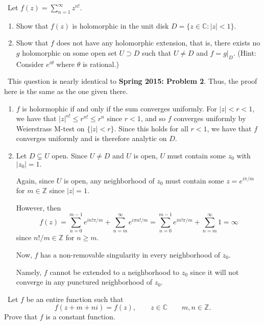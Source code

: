 \documentclass[12pt]{Qual}
\begin{document}
\begin{problem} $\,$
Let $f(z)=\sum_{n=1}^\infty z^{n!}$.
\begin{enumerate}[label=(\alph*)]
    \item Show that $f(z)$ is holomorphic in the unit disk $D=\{z\in\mathbb{C}:|z|<1\}$.
    \item Show that $f$ does not have any holomorphic extension, that is, there exists no $g$ holomorphic on some open set $U\supset D$ such that $U\not=D$ and $f=g|_D$. (Hint: Consider $e^{i\theta}$ where $\theta$ is rational.)
\end{enumerate}
\end{problem}


\begin{solution}$\,$
This question is nearly identical to \textbf{Spring 2015: Problem 2}. Thus, the proof here is the same as the one given there.
\begin{enumerate}[label=(\alph*)]
    \item $f$ is holormophic if and only if the sum converges uniformly. For $|z|<r<1$, we have that $|z|^{n!}\le r^{n!}\le r^n$ since $r<1$, and so $f$ converges uniformly by Weierstrass M-test on $\{|z|<r\}.$ Since this holds for all $r<1$, we have that $f$ converges uniformly and is therefore analytic on $D.$
    \item Let $D\subsetneq U$ open. Since $U\not=D$ and $U$ is open, $U$ must contain some $z_0$ with $|z_0|=1.$

    Again, since $U$ is open, any neighborhood of $z_0$ must contain some $z=e^{i\pi/m}$ for $m\in\mathbb{Z}$ since $|z|=1.$

    However, then $$f(z)=\sum_{n=0}^{m-1}e^{in!\pi/m}+\sum_{n=m}^\infty e^{i\pi n!/m}=\sum_{n=0}^{m-1}e^{in!\pi/m}+\sum_{n=m}^\infty 1=\infty$$ since $n!/m\in\mathbb{Z}$ for $n\ge m.$

    Now, $f$ has a non-removable singularity in every neighborhood of $z_0$.

    Namely, $f$ cannot be extended to a neighborhood to $z_0$ since it will not converge in any punctured neighborhood of $z_0.$
\end{enumerate}
\end{solution}
\newpage





\begin{problem} $\,$
Let $f$ be an entire function such that $$f(z+m+ni)=f(z),\qquad z\in\mathbb{C}\qquad m,n\in\mathbb{Z}.$$ Prove that $f$ is a constant function.
\end{problem}
\end{document}
